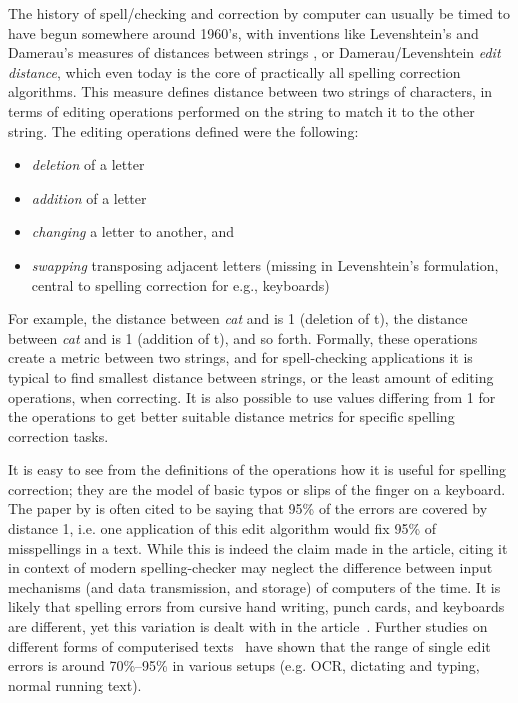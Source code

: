 \documentclass[officiallayout]{unihelcompling}
\newcommand\misspelt{\bgroup\markoverwith
{\textcolor{red}{\lower3.5pt\hbox{\sixly \char58}}}\ULon}
\begin{document}
The history of spell\-/checking and correction by computer can usually be timed
to have begun somewhere around 1960's, with inventions like Levenshtein's and
Damerau's measures of distances between strings
\citep{levenshtein1966binary,damerau1964technique}, or Damerau\-/Levenshtein
\emph{edit distance}, which even today is the core of practically all spelling
correction algorithms. This measure defines distance between two strings of
characters, in terms of editing operations performed on the string to match it
to the other string. The editing operations defined were the following:

\begin{itemize}
    \item \emph{deletion} of a letter
    \item \emph{addition} of a letter
    \item \emph{changing} a letter to another, and
    \item \emph{swapping} transposing adjacent letters (missing in
        Levenshtein's formulation, central to spelling correction for
        e.g., keyboards)
\end{itemize}

For example, the distance between \emph{cat} and \misspelt{ca} is 1 (deletion
of t), the distance between \emph{cat} and \misspelt{catt} is 1 (addition of
t), and so forth. Formally, these operations create a metric between two
strings, and for spell-checking applications it is typical to find smallest
distance between strings, or the least amount of editing operations, when
correcting. It is also possible to use values differing from 1 for the
operations to get better suitable distance metrics for specific spelling
correction tasks.

It is easy to see from the definitions of the operations how it is useful
for spelling correction; they are the model of basic typos or slips of the
finger on a keyboard. The paper by \citet{damerau1964technique} is often cited
to be saying that 95\% of the errors are covered by distance 1, i.e. one
application of this edit algorithm would fix 95\% of misspellings in a text.
While this is indeed the claim made in the article, citing it in context of
modern spelling-checker may neglect the difference between input mechanisms
(and data transmission, and storage) of computers of the time. It is likely
that spelling errors from cursive hand writing, punch cards, and keyboards are
different, yet this variation is dealt with in the
article~\citep{damerau1964technique}. Further studies on different forms of
computerised texts~\citep{kukich1992techniques} have shown that the range of
single edit errors is around 70\%--95\% in various setups (e.g. OCR,
dictating and typing, normal running text).
\end{document}
